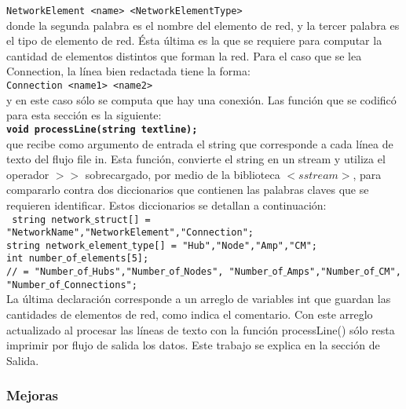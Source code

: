 \documentclass[10pt,a4paper]{report}
\begin{document}
\texttt{NetworkElement <name> <NetworkElementType>}\\

donde la segunda palabra es el nombre del elemento de red, y la tercer palabra es el tipo de elemento de red. Ésta última es la que se requiere para computar la cantidad de elementos distintos que forman la red. Para el caso que se lea Connection, la línea bien redactada tiene la forma:\\

\texttt{Connection	<name1>	<name2>}\\

y en este caso sólo se computa que hay una conexión. Las función que se codificó para esta sección es la siguiente:\\

\texttt{\textbf{void processLine(string textline);}}\\

que recibe como argumento de entrada el string que corresponde a cada línea de texto del flujo file in. Esta función, convierte el string en un stream y utiliza el operador $>>$ sobrecargado, por medio de la biblioteca $<sstream>$, para compararlo contra dos diccionarios que contienen las palabras claves que se requieren identificar. Estos diccionarios se detallan a continuación:\\

\texttt{
string network$\_$struct[]   = {"NetworkName","NetworkElement","Connection"};\\
string network$\_$element$\_$type[] = {"Hub","Node","Amp","CM"};\\
int number$\_$of$\_$elements[5];\\
// = {"Number$\_$of$\_$Hubs","Number$\_$of$\_$Nodes", "Number$\_$of$\_$Amps","Number$\_$of$\_$CM", "Number$\_$of$\_$Connections"};
}\\

La última declaración corresponde a un arreglo de variables int que guardan las cantidades de elementos de red, como indica el comentario. Con este arreglo actualizado al procesar las líneas de texto con la función processLine() sólo resta imprimir por flujo de salida los datos. Este trabajo se explica en la sección de Salida.\\

\subsubsection{Mejoras}
\end{document}
